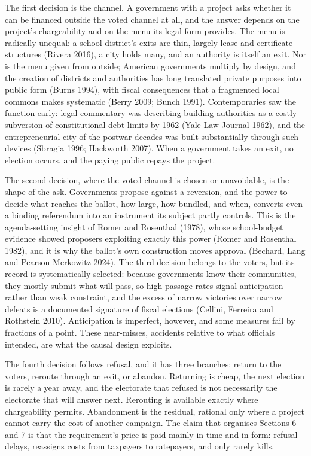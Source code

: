 The first decision is the channel. A government with a project asks whether it can be financed outside the voted channel at all, and the answer depends on the project's chargeability and on the menu its legal form provides. The menu is radically unequal: a school district's exits are thin, largely lease and certificate structures (Rivera 2016), a city holds many, and an authority is itself an exit. Nor is the menu given from outside; American governments multiply by design, and the creation of districts and authorities has long translated private purposes into public form (Burns 1994), with fiscal consequences that a fragmented local commons makes systematic (Berry 2009; Bunch 1991). Contemporaries saw the function early: legal commentary was describing building authorities as a costly subversion of constitutional debt limits by 1962 (Yale Law Journal 1962), and the entrepreneurial city of the postwar decades was built substantially through such devices (Sbragia 1996; Hackworth 2007). When a government takes an exit, no election occurs, and the paying public repays the project.

The second decision, where the voted channel is chosen or unavoidable, is the shape of the ask. Governments propose against a reversion, and the power to decide what reaches the ballot, how large, how bundled, and when, converts even a binding referendum into an instrument its subject partly controls. This is the agenda-setting insight of Romer and Rosenthal (1978), whose school-budget evidence showed proposers exploiting exactly this power (Romer and Rosenthal 1982), and it is why the ballot's own construction moves approval (Bechard, Lang and Pearson-Merkowitz 2024). The third decision belongs to the voters, but its record is systematically selected: because governments know their communities, they mostly submit what will pass, so high passage rates signal anticipation rather than weak constraint, and the excess of narrow victories over narrow defeats is a documented signature of fiscal elections (Cellini, Ferreira and Rothstein 2010). Anticipation is imperfect, however, and some measures fail by fractions of a point. These near-misses, accidents relative to what officials intended, are what the causal design exploits.

The fourth decision follows refusal, and it has three branches: return to the voters, reroute through an exit, or abandon. Returning is cheap, the next election is rarely a year away, and the electorate that refused is not necessarily the electorate that will answer next. Rerouting is available exactly where chargeability permits. Abandonment is the residual, rational only where a project cannot carry the cost of another campaign. The claim that organises Sections 6 and 7 is that the requirement's price is paid mainly in time and in form: refusal delays, reassigns costs from taxpayers to ratepayers, and only rarely kills.

